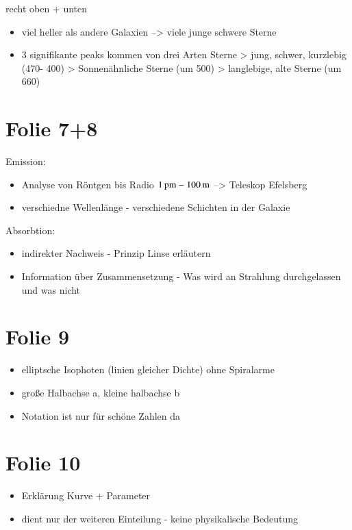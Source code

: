 recht oben + unten

\begin{itemize}
\item viel heller als andere Galaxien --> viele junge schwere Sterne
\item 3 signifikante peaks kommen von drei Arten Sterne
\subitem > jung, schwer, kurzlebig (470- 400)
\subitem > Sonnenähnliche Sterne (um 500)
\subitem > langlebige, alte Sterne (um 660)
\end{itemize}


\section{Folie 7+8}


Emission:

\begin{itemize}
\item Analyse von Röntgen bis Radio $\unit[1]{pm} - \unit[100]{m}$ --> Teleskop Efelsberg
\item verschiedne Wellenlänge - verschiedene Schichten in der Galaxie
\end{itemize}

Absorbtion:

\begin{itemize}
\item indirekter Nachweis - Prinzip Linse erläutern
\item Information über Zusammensetzung - Was wird an Strahlung durchgelassen und was nicht
\end{itemize}



\section{Folie 9}

\begin{itemize}
\item elliptsche Isophoten (linien gleicher Dichte) ohne Spiralarme
\item große Halbachse a, kleine halbachse b 
\item Notation ist nur für schöne Zahlen da
\end{itemize}


\section{Folie 10}

\begin{itemize}
\item Erklärung Kurve + Parameter
\item dient nur der weiteren Einteilung - keine physikalische Bedeutung
\end{itemize}


